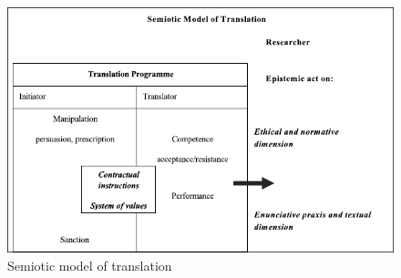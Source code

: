 \documentclass[output=paper]{LSP/langsci}
\begin{document}
% 
% 
% 
% 
% 
% 
% 
% 
% 
% 
% 

\begin{figure}
\includegraphics[width=\textwidth]{figures/troqe-marchan/figure1.pdf}
\caption{Semiotic model of translation}
\label{troqe-marchan:fig:1}
\end{figure}
\end{document}
